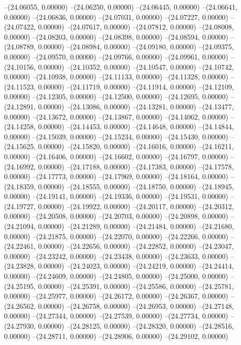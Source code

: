 --(24.06055, 0.00000)
--(24.06250, 0.00000)
--(24.06445, 0.00000)
--(24.06641, 0.00000)
--(24.06836, 0.00000)
--(24.07031, 0.00000)
--(24.07227, 0.00000)
--(24.07422, 0.00000)
--(24.07617, 0.00000)
--(24.07812, 0.00000)
--(24.08008, 0.00000)
--(24.08203, 0.00000)
--(24.08398, 0.00000)
--(24.08594, 0.00000)
--(24.08789, 0.00000)
--(24.08984, 0.00000)
--(24.09180, 0.00000)
--(24.09375, 0.00000)
--(24.09570, 0.00000)
--(24.09766, 0.00000)
--(24.09961, 0.00000)
--(24.10156, 0.00000)
--(24.10352, 0.00000)
--(24.10547, 0.00000)
--(24.10742, 0.00000)
--(24.10938, 0.00000)
--(24.11133, 0.00000)
--(24.11328, 0.00000)
--(24.11523, 0.00000)
--(24.11719, 0.00000)
--(24.11914, 0.00000)
--(24.12109, 0.00000)
--(24.12305, 0.00000)
--(24.12500, 0.00000)
--(24.12695, 0.00000)
--(24.12891, 0.00000)
--(24.13086, 0.00000)
--(24.13281, 0.00000)
--(24.13477, 0.00000)
--(24.13672, 0.00000)
--(24.13867, 0.00000)
--(24.14062, 0.00000)
--(24.14258, 0.00000)
--(24.14453, 0.00000)
--(24.14648, 0.00000)
--(24.14844, 0.00000)
--(24.15039, 0.00000)
--(24.15234, 0.00000)
--(24.15430, 0.00000)
--(24.15625, 0.00000)
--(24.15820, 0.00000)
--(24.16016, 0.00000)
--(24.16211, 0.00000)
--(24.16406, 0.00000)
--(24.16602, 0.00000)
--(24.16797, 0.00000)
--(24.16992, 0.00000)
--(24.17188, 0.00000)
--(24.17383, 0.00000)
--(24.17578, 0.00000)
--(24.17773, 0.00000)
--(24.17969, 0.00000)
--(24.18164, 0.00000)
--(24.18359, 0.00000)
--(24.18555, 0.00000)
--(24.18750, 0.00000)
--(24.18945, 0.00000)
--(24.19141, 0.00000)
--(24.19336, 0.00000)
--(24.19531, 0.00000)
--(24.19727, 0.00000)
--(24.19922, 0.00000)
--(24.20117, 0.00000)
--(24.20312, 0.00000)
--(24.20508, 0.00000)
--(24.20703, 0.00000)
--(24.20898, 0.00000)
--(24.21094, 0.00000)
--(24.21289, 0.00000)
--(24.21484, 0.00000)
--(24.21680, 0.00000)
--(24.21875, 0.00000)
--(24.22070, 0.00000)
--(24.22266, 0.00000)
--(24.22461, 0.00000)
--(24.22656, 0.00000)
--(24.22852, 0.00000)
--(24.23047, 0.00000)
--(24.23242, 0.00000)
--(24.23438, 0.00000)
--(24.23633, 0.00000)
--(24.23828, 0.00000)
--(24.24023, 0.00000)
--(24.24219, 0.00000)
--(24.24414, 0.00000)
--(24.24609, 0.00000)
--(24.24805, 0.00000)
--(24.25000, 0.00000)
--(24.25195, 0.00000)
--(24.25391, 0.00000)
--(24.25586, 0.00000)
--(24.25781, 0.00000)
--(24.25977, 0.00000)
--(24.26172, 0.00000)
--(24.26367, 0.00000)
--(24.26562, 0.00000)
--(24.26758, 0.00000)
--(24.26953, 0.00000)
--(24.27148, 0.00000)
--(24.27344, 0.00000)
--(24.27539, 0.00000)
--(24.27734, 0.00000)
--(24.27930, 0.00000)
--(24.28125, 0.00000)
--(24.28320, 0.00000)
--(24.28516, 0.00000)
--(24.28711, 0.00000)
--(24.28906, 0.00000)
--(24.29102, 0.00000)
